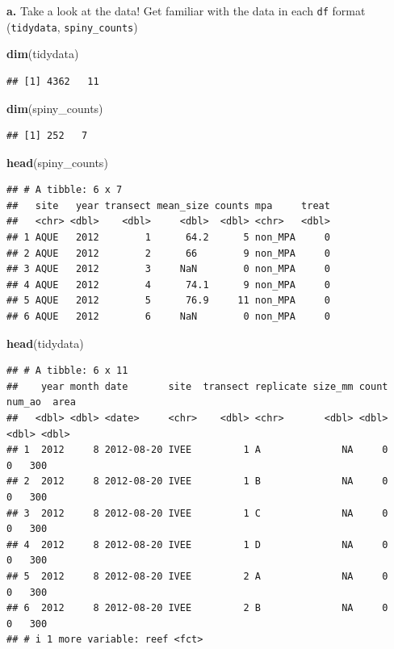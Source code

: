 \documentclass[
]{article}
\newenvironment{Shaded}{\begin{snugshade}}{\end{snugshade}}
\newcommand{\FunctionTok}[1]{\textcolor[rgb]{0.13,0.29,0.53}{\textbf{#1}}}
\newcommand{\NormalTok}[1]{#1}
\begin{document}
\textbf{a.} Take a look at the data! Get familiar with the data in each
\texttt{df} format (\texttt{tidydata}, \texttt{spiny\_counts})

\begin{Shaded}
\begin{Highlighting}[]
\FunctionTok{dim}\NormalTok{(tidydata)}
\end{Highlighting}
\end{Shaded}

\begin{verbatim}
## [1] 4362   11
\end{verbatim}

\begin{Shaded}
\begin{Highlighting}[]
\FunctionTok{dim}\NormalTok{(spiny\_counts)}
\end{Highlighting}
\end{Shaded}

\begin{verbatim}
## [1] 252   7
\end{verbatim}

\begin{Shaded}
\begin{Highlighting}[]
\FunctionTok{head}\NormalTok{(spiny\_counts)}
\end{Highlighting}
\end{Shaded}

\begin{verbatim}
## # A tibble: 6 x 7
##   site   year transect mean_size counts mpa     treat
##   <chr> <dbl>    <dbl>     <dbl>  <dbl> <chr>   <dbl>
## 1 AQUE   2012        1      64.2      5 non_MPA     0
## 2 AQUE   2012        2      66        9 non_MPA     0
## 3 AQUE   2012        3     NaN        0 non_MPA     0
## 4 AQUE   2012        4      74.1      9 non_MPA     0
## 5 AQUE   2012        5      76.9     11 non_MPA     0
## 6 AQUE   2012        6     NaN        0 non_MPA     0
\end{verbatim}

\begin{Shaded}
\begin{Highlighting}[]
\FunctionTok{head}\NormalTok{(tidydata)}
\end{Highlighting}
\end{Shaded}

\begin{verbatim}
## # A tibble: 6 x 11
##    year month date       site  transect replicate size_mm count num_ao  area
##   <dbl> <dbl> <date>     <chr>    <dbl> <chr>       <dbl> <dbl>  <dbl> <dbl>
## 1  2012     8 2012-08-20 IVEE         1 A              NA     0      0   300
## 2  2012     8 2012-08-20 IVEE         1 B              NA     0      0   300
## 3  2012     8 2012-08-20 IVEE         1 C              NA     0      0   300
## 4  2012     8 2012-08-20 IVEE         1 D              NA     0      0   300
## 5  2012     8 2012-08-20 IVEE         2 A              NA     0      0   300
## 6  2012     8 2012-08-20 IVEE         2 B              NA     0      0   300
## # i 1 more variable: reef <fct>
\end{verbatim}
\end{document}
